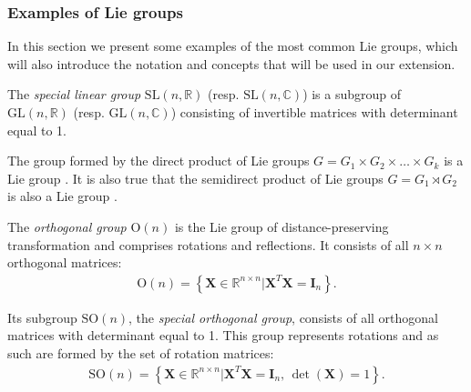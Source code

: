 \subsubsection{Examples of Lie groups}
In this section we present some examples of the most common Lie groups, which will also introduce the notation and concepts that will be used in our extension.
\begin{example}\label{ex:general-linear-group-special-linear-group}
    The \emph{special linear group} $\text{SL}(n, \mathbb{R})$ (resp. $\text{SL}(n, \mathbb{C})$) is a subgroup of $\text{GL}(n, \mathbb{R})$ (resp. $\text{GL}(n, \mathbb{C})$) consisting of invertible matrices with determinant equal to 1.
\end{example}
\begin{example}
    The group formed by the direct product of Lie groups $G = G_1 \times G_2 \times \dots \times G_k$ is a Lie group \citep[p. 152]{Lee2012}. It is also true that the semidirect product of Lie groups $G = G_1\rtimes G_2$ is also a Lie group \citep[p. 168]{Lee2012}.
\end{example}
\begin{example}\label{ex:orthogonal-group-special-orthogonal-group}
    The \emph{orthogonal group} $\text{O}(n)$ is the Lie group of distance-preserving transformation and comprises rotations and reflections. It consists of all $n\times n$ orthogonal matrices:
    \begin{align}
        \text{O}(n) = \left\{\mathbf{X}\in\mathbb{R}^{n\times n} | \mathbf{X}^T\mathbf{X} = \mathbf{I}_n\right\}.
    \end{align}

    Its subgroup $\text{SO}(n)$, the \emph{special orthogonal group}, consists of all orthogonal matrices with determinant equal to 1. This group represents rotations and as such are formed by the set of rotation matrices:
    \begin{align}
        \text{SO}(n) = \left\{\mathbf{X}\in\mathbb{R}^{n\times n} | \mathbf{X}^T\mathbf{X} = \mathbf{I}_n,\, \det(\mathbf{X}) = 1\right\}.
    \end{align}
\end{example}
